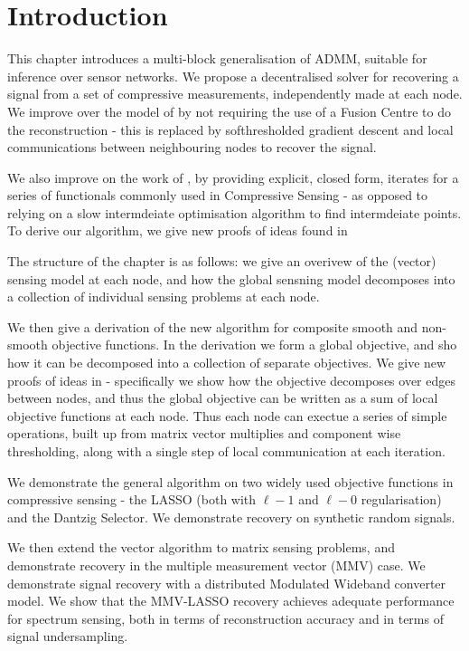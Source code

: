 \section{Introduction}

This chapter introduces a multi-block generalisation of ADMM, suitable for inference over sensor networks. We propose a decentralised solver for recovering a signal from a set of compressive measurements, independently made at each node. We improve over the model of \cite{Zhang2011b} by not requiring the use of a Fusion Centre to do the reconstruction - this is replaced by softhresholded gradient descent and local communications between neighbouring nodes to recover the signal. 

We also improve on the work of \cite{mota2013d}, by providing explicit, closed form, iterates for a series of functionals commonly used in Compressive Sensing - as opposed to relying on a slow intermdeiate optimisation algorithm to find intermdeiate points. To derive our algorithm, we give new proofs of ideas found in \cite{mota2013d}

The structure of the chapter is as follows: we give an overivew of the (vector) sensing model at each node, and how the global sensning model decomposes into a collection of individual sensing problems at each node. 

We then give a derivation of the new algorithm for composite smooth and non-smooth objective functions. In the derivation we form a global objective, and sho how it can be decomposed into a collection of separate objectives. We give new proofs of ideas in \cite{mota2013d} - specifically we show how the objective decomposes over edges between nodes, and thus the global objective can be written as a sum of local objective functions at each node. Thus each node can exectue a series of simple operations, built up from matrix vector multiplies and component wise thresholding, along with a single step of local communication at each iteration.

We demonstrate the general algorithm on two widely used objective functions in compressive sensing - the LASSO (both with \(\ell-1\) and \(\ell-0\) regularisation) and the Dantzig Selector. We demonstrate recovery on synthetic random signals.

We then extend the vector algorithm to matrix sensing problems, and demonstrate recovery in the multiple measurement vector (MMV) case. We demonstrate signal recovery with a distributed Modulated Wideband converter model. We show that the MMV-LASSO recovery achieves adequate performance for spectrum sensing, both in terms of reconstruction accuracy and in terms of signal undersampling. 


